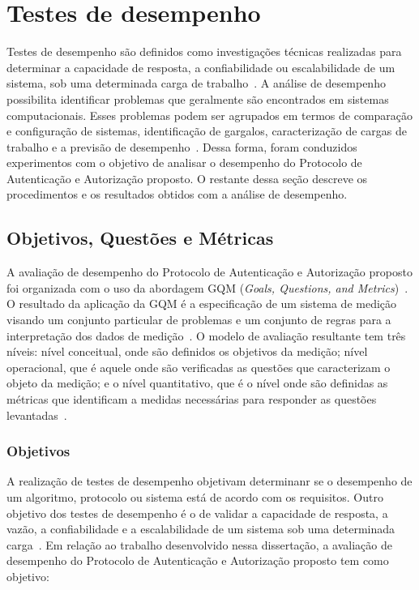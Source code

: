\section{Testes de desempenho}

Testes de desempenho são definidos como investiga\c c\~{o}es técnicas realizadas para determinar a capacidade de resposta, a confiabilidade ou escalabilidade de um sistema, sob uma determinada carga de trabalho~\cite{Meier2007}.
A análise de desempenho possibilita identificar problemas que geralmente são encontrados em sistemas computacionais.
Esses problemas podem ser agrupados em termos de comparação e configuração de sistemas, identificação de gargalos, caracterização de cargas de trabalho e a previsão de desempenho~\cite{jain1991art}. Dessa forma, foram conduzidos experimentos com o objetivo de analisar o desempenho do Protocolo de Autenticação e Autorização proposto. O restante dessa se\c c\~{a}o descreve os procedimentos e os resultados obtidos com a an\'{a}lise de desempenho.

\subsection{Objetivos, Questões e Métricas}\label{sec:gqm}

A avaliação de desempenho do Protocolo de Autenticação e Autorização proposto foi organizada com o uso da abordagem
GQM (\emph{Goals, Questions, and Metrics})~\cite{gqm}. O resultado da aplicação da GQM é a especificação de um sistema de
medição visando um conjunto particular de problemas e um conjunto de regras para a interpretação dos dados de medição~\cite{gqm}.
O modelo de avaliação resultante tem três níveis: nível conceitual, onde  são definidos os objetivos da medição; nível operacional, que é aquele onde são verificadas as questões  que caracterizam o objeto da medição; e o nível quantitativo, que é o nível onde são definidas as métricas que identificam a medidas necessárias para responder as questões levantadas~\cite{gqm}.

\subsubsection{Objetivos }\label{sec:gqmobjetivos}

A realização de testes de desempenho objetivam determinanr se o desempenho de um algoritmo, protocolo ou sistema está de acordo com os requisitos. Outro objetivo dos testes de desempenho é o de validar a capacidade de resposta, a vazão, a confiabilidade e a escalabilidade de um sistema sob uma determinada carga~\cite{Meier2007}. Em relação ao trabalho desenvolvido nessa dissertação, a avaliação de desempenho do Protocolo de Autenticação e Autorização proposto tem como objetivo:

